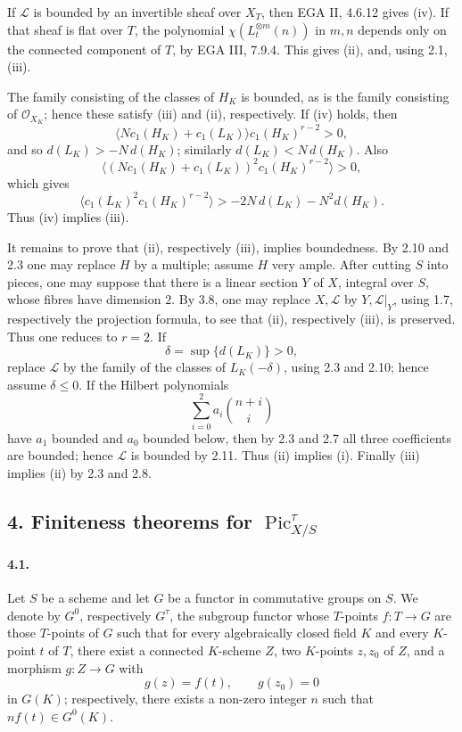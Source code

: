\documentclass[12pt]{article}
\newcommand{\cO}{\mathcal O}
\newcommand{\cL}{\mathcal L}
\newcommand{\Pic}{\operatorname{Pic}}
\begin{document}
If $\cL$ is bounded by an invertible sheaf over $X_T$, then EGA II, 4.6.12 gives (iv). If that sheaf is flat over $T$, the polynomial $\chi(L_t^{\otimes m}(n))$ in $m,n$ depends only on the connected component of $T$, by EGA III, 7.9.4. This gives (ii), and, using 2.1, (iii).

The family consisting of the classes of $H_K$ is bounded, as is the family consisting of $\cO_{X_K}$; hence these satisfy (iii) and (ii), respectively. If (iv) holds, then
\[
\langle N c_1(H_K)+c_1(L_K)\rangle c_1(H_K)^{r-2}>0,
\]
and so $d(L_K)>-N\,d(H_K)$; similarly $d(L_K)<N\,d(H_K)$. Also
\[
\langle (N c_1(H_K)+c_1(L_K))^2c_1(H_K)^{r-2}\rangle>0,
\]
which gives
\[
\langle c_1(L_K)^2c_1(H_K)^{r-2}\rangle
  > -2N\,d(L_K)-N^2d(H_K).
\]
Thus (iv) implies (iii).

It remains to prove that (ii), respectively (iii), implies boundedness. By 2.10 and 2.3 one may replace $H$ by a multiple; assume $H$ very ample. After cutting $S$ into pieces, one may suppose that there is a linear section $Y$ of $X$, integral over $S$, whose fibres have dimension $2$. By 3.8, one may replace $X,\cL$ by $Y,\cL|_Y$, using 1.7, respectively the projection formula, to see that (ii), respectively (iii), is preserved. Thus one reduces to $r=2$. If
\[
\delta=\sup\{d(L_K)\}>0,
\]
replace $\cL$ by the family of the classes of $L_K(-\delta)$, using 2.3 and 2.10; hence assume $\delta\leq 0$. If the Hilbert polynomials
\[
\sum_{i=0}^2 a_i\binom{n+i}{i}
\]
have $a_1$ bounded and $a_0$ bounded below, then by 2.3 and 2.7 all three coefficients are bounded; hence $\cL$ is bounded by 2.11. Thus (ii) implies (i). Finally (iii) implies (ii) by 2.3 and 2.8.

\subsection*{4. Finiteness theorems for $\Pic^\tau_{X/S}$}

\paragraph{4.1.}
Let $S$ be a scheme and let $G$ be a functor in commutative groups on $S$. We denote by $G^0$, respectively $G^\tau$, the subgroup functor whose $T$-points $f:T\to G$ are those $T$-points of $G$ such that for every algebraically closed field $K$ and every $K$-point $t$ of $T$, there exist a connected $K$-scheme $Z$, two $K$-points $z,z_0$ of $Z$, and a morphism $g:Z\to G$ with
\[
g(z)=f(t),\qquad g(z_0)=0
\]
in $G(K)$; respectively, there exists a non-zero integer $n$ such that $n f(t)\in G^0(K)$.
\end{document}
